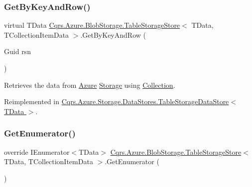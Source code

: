 \subsubsection{\texorpdfstring{Get\+By\+Key\+And\+Row()}{GetByKeyAndRow()}}
{\footnotesize\ttfamily virtual T\+Data \hyperlink{classCqrs_1_1Azure_1_1BlobStorage_1_1TableStorageStore}{Cqrs.\+Azure.\+Blob\+Storage.\+Table\+Storage\+Store}$<$ T\+Data, T\+Collection\+Item\+Data $>$.Get\+By\+Key\+And\+Row (\begin{DoxyParamCaption}\item[{Guid}]{rsn }\end{DoxyParamCaption})\hspace{0.3cm}{\ttfamily [virtual]}}



Retrieves the data from \hyperlink{namespaceCqrs_1_1Azure}{Azure} \hyperlink{namespaceCqrs_1_1Azure_1_1Storage}{Storage} using \hyperlink{classCqrs_1_1Azure_1_1BlobStorage_1_1TableStorageStore_a97752ec9c5ad130a230924da9a75a537_a97752ec9c5ad130a230924da9a75a537}{Collection}. 



Reimplemented in \hyperlink{classCqrs_1_1Azure_1_1Storage_1_1DataStores_1_1TableStorageDataStore_a61e3fc6404283606ec41a5e5a3c72ac8_a61e3fc6404283606ec41a5e5a3c72ac8}{Cqrs.\+Azure.\+Storage.\+Data\+Stores.\+Table\+Storage\+Data\+Store$<$ T\+Data $>$}.

\mbox{\label{classCqrs_1_1Azure_1_1BlobStorage_1_1TableStorageStore_ac3e684b894e739f8936e537806952c49_ac3e684b894e739f8936e537806952c49}} 
\subsubsection{\texorpdfstring{Get\+Enumerator()}{GetEnumerator()}}
{\footnotesize\ttfamily override I\+Enumerator$<$T\+Data$>$ \hyperlink{classCqrs_1_1Azure_1_1BlobStorage_1_1TableStorageStore}{Cqrs.\+Azure.\+Blob\+Storage.\+Table\+Storage\+Store}$<$ T\+Data, T\+Collection\+Item\+Data $>$.Get\+Enumerator (\begin{DoxyParamCaption}{ }\end{DoxyParamCaption})\hspace{0.3cm}{\ttfamily [virtual]}}



